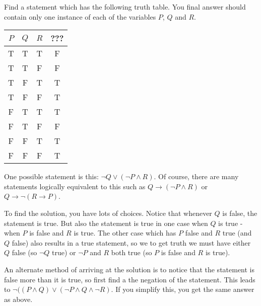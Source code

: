 \documentclass[10pt]{exam}
\def\and{\wedge}
\def\imp{\rightarrow}
\begin{document}
\begin{questions}
\question[4] Find a statement which has the following truth table.  You final answer should contain only one instance of each of the variables $P$, $Q$ and $R$.

\begin{center}
  \begin{tabular}{c|c|c||c}
    $P$ & $Q$ & $R$ & ???\\ \hline
    T & T & T & F \\
    T & T & F & F \\
    T & F & T & T \\
    T & F & F & T \\
    F & T & T & T \\
    F & T & F & F \\
    F & F & T & T \\
    F & F & F & T
  \end{tabular}
\end{center}
\begin{solution}
  One possible statement is this: $\neg Q \vee (\neg P \and R)$.  Of course, there are many statements logically equivalent to this such as $Q \imp (\neg P \and R)$ or $Q \imp \neg(R \imp P)$.  
  
  To find the solution, you have lots of choices.  Notice that whenever $Q$ is false, the statement is true.  But also the statement is true in one case when $Q$ is true - when $P$ is false and $R$ is true.  The other case which has $P$ false and $R$ true (and $Q$ false) also results in a true statement, so we to get truth we must have either $Q$ false (so $\neg Q$ true) or $\neg P$ and $R$ both true (so $P$ is false and $R$ is true).
  
  An alternate method of arriving at the solution is to notice that the statement is false more than it is true, so first find a the negation of the statement.  This leads to $\neg ((P \and Q) \vee (\neg P \and Q \and \neg R)$.  If you simplify this, you get the same answer as above.
\end{solution}


\end{questions}
\end{document}
